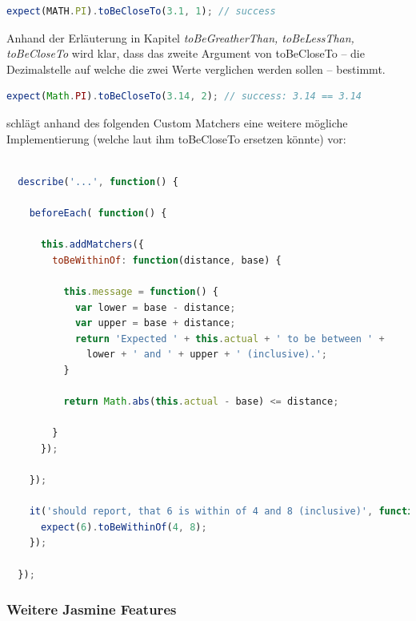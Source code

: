 \newpage
\begin{lstlisting}[language=JavaScript]
expect(MATH.PI).toBeCloseTo(3.1, 1); // success
\end{lstlisting}

Anhand der Erläuterung in Kapitel \textit{toBeGreatherThan, toBeLessThan, toBeCloseTo} wird klar, dass das zweite Argument von toBeCloseTo -- die Dezimalstelle auf welche die zwei Werte verglichen werden sollen -- bestimmt.

\begin{lstlisting}[language=JavaScript]
expect(Math.PI).toBeCloseTo(3.14, 2); // success: 3.14 == 3.14
\end{lstlisting}

\cite[21]{Hahn:2013} schlägt anhand des folgenden Custom Matchers eine weitere mögliche Implementierung (welche laut ihm toBeCloseTo ersetzen könnte) vor:

\begin{lstlisting}[language=JavaScript]

  describe('...', function() {

    beforeEach( function() {

      this.addMatchers({
        toBeWithinOf: function(distance, base) {

          this.message = function() {
            var lower = base - distance;
            var upper = base + distance;
            return 'Expected ' + this.actual + ' to be between ' +
              lower + ' and ' + upper + ' (inclusive).';
          }

          return Math.abs(this.actual - base) <= distance;

        }
      });

    });

    it('should report, that 6 is within of 4 and 8 (inclusive)', function() {
      expect(6).toBeWithinOf(4, 8);
    });

  });

\end{lstlisting}

\subsubsection{Weitere Jasmine Features}

